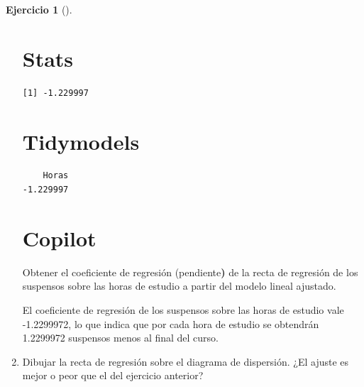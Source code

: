 \documentclass[
  a4paper,
]{scrreport}
\newenvironment{Shaded}{\begin{snugshade}}{\end{snugshade}}
\newcommand{\DecValTok}[1]{\textcolor[rgb]{0.68,0.00,0.00}{#1}}
\newcommand{\ErrorTok}[1]{\textcolor[rgb]{0.68,0.00,0.00}{#1}}
\newcommand{\ExtensionTok}[1]{\textcolor[rgb]{0.00,0.23,0.31}{#1}}
\newcommand{\KeywordTok}[1]{\textcolor[rgb]{0.00,0.23,0.31}{\textbf{#1}}}
\newcommand{\NormalTok}[1]{\textcolor[rgb]{0.00,0.23,0.31}{#1}}
\newcommand{\SpecialCharTok}[1]{\textcolor[rgb]{0.37,0.37,0.37}{#1}}
\newcommand{\StringTok}[1]{\textcolor[rgb]{0.13,0.47,0.30}{#1}}
\theoremstyle{definition}
\newtheorem{exercise}{Ejercicio}[chapter]
\theoremstyle{remark}
\begin{document}
\begin{exercise}[]
\begin{enumerate}
\begin{tcolorbox}
  \section{Stats}

\begin{Shaded}
\end{Shaded}

\begin{verbatim}
[1] -1.229997
\end{verbatim}

  \section{Tidymodels}

\begin{Shaded}
\end{Shaded}

\begin{verbatim}
    Horas 
-1.229997 
\end{verbatim}

  \section{Copilot}

\begin{Shaded}
\begin{Highlighting}[]
\ExtensionTok{Obtener}\NormalTok{ el coeficiente de regresión }\ErrorTok{(}\ExtensionTok{pendiente}\KeywordTok{)} \ExtensionTok{de}\NormalTok{ la recta de regresión de los suspensos sobre las horas de estudio a partir del modelo lineal ajustado.}
\end{Highlighting}
\end{Shaded}

  El coeficiente de regresión de los suspensos sobre las horas de
  estudio vale -1.2299972, lo que indica que por cada hora de estudio se
  obtendrán 1.2299972 suspensos menos al final del curso.

  \end{tcolorbox}
\item
  Dibujar la recta de regresión sobre el diagrama de dispersión. ¿El
  ajuste es mejor o peor que el del ejercicio anterior?


\end{enumerate}
\end{exercise}
\end{document}
